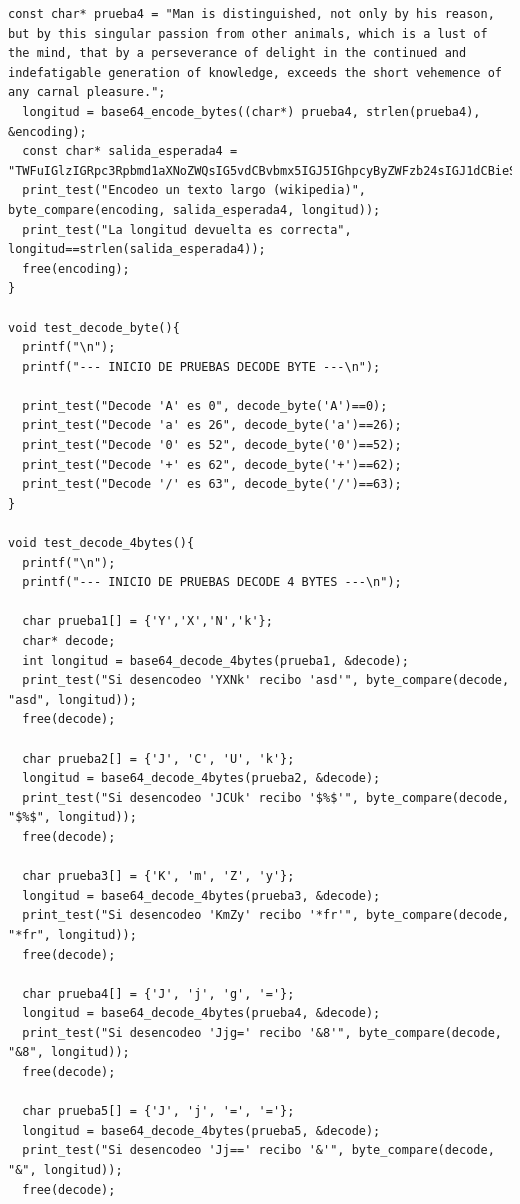 \documentclass[11pt]{article}
\begin{document}
\begin{lstlisting}[style=Cstyle]
  const char* prueba4 = "Man is distinguished, not only by his reason, but by this singular passion from other animals, which is a lust of the mind, that by a perseverance of delight in the continued and indefatigable generation of knowledge, exceeds the short vehemence of any carnal pleasure.";
  longitud = base64_encode_bytes((char*) prueba4, strlen(prueba4), &encoding);
  const char* salida_esperada4 = "TWFuIGlzIGRpc3Rpbmd1aXNoZWQsIG5vdCBvbmx5IGJ5IGhpcyByZWFzb24sIGJ1dCBieSB0aGlzIHNpbmd1bGFyIHBhc3Npb24gZnJvbSBvdGhlciBhbmltYWxzLCB3aGljaCBpcyBhIGx1c3Qgb2YgdGhlIG1pbmQsIHRoYXQgYnkgYSBwZXJzZXZlcmFuY2Ugb2YgZGVsaWdodCBpbiB0aGUgY29udGludWVkIGFuZCBpbmRlZmF0aWdhYmxlIGdlbmVyYXRpb24gb2Yga25vd2xlZGdlLCBleGNlZWRzIHRoZSBzaG9ydCB2ZWhlbWVuY2Ugb2YgYW55IGNhcm5hbCBwbGVhc3VyZS4=";
  print_test("Encodeo un texto largo (wikipedia)", byte_compare(encoding, salida_esperada4, longitud));
  print_test("La longitud devuelta es correcta", longitud==strlen(salida_esperada4));
  free(encoding);
}

void test_decode_byte(){
  printf("\n");
  printf("--- INICIO DE PRUEBAS DECODE BYTE ---\n");

  print_test("Decode 'A' es 0", decode_byte('A')==0);
  print_test("Decode 'a' es 26", decode_byte('a')==26);
  print_test("Decode '0' es 52", decode_byte('0')==52);
  print_test("Decode '+' es 62", decode_byte('+')==62);
  print_test("Decode '/' es 63", decode_byte('/')==63);
}

void test_decode_4bytes(){
  printf("\n");
  printf("--- INICIO DE PRUEBAS DECODE 4 BYTES ---\n");

  char prueba1[] = {'Y','X','N','k'};
  char* decode;
  int longitud = base64_decode_4bytes(prueba1, &decode);
  print_test("Si desencodeo 'YXNk' recibo 'asd'", byte_compare(decode, "asd", longitud));
  free(decode);

  char prueba2[] = {'J', 'C', 'U', 'k'};
  longitud = base64_decode_4bytes(prueba2, &decode);
  print_test("Si desencodeo 'JCUk' recibo '$%$'", byte_compare(decode, "$%$", longitud));
  free(decode);

  char prueba3[] = {'K', 'm', 'Z', 'y'};
  longitud = base64_decode_4bytes(prueba3, &decode);
  print_test("Si desencodeo 'KmZy' recibo '*fr'", byte_compare(decode, "*fr", longitud));
  free(decode);

  char prueba4[] = {'J', 'j', 'g', '='};
  longitud = base64_decode_4bytes(prueba4, &decode);
  print_test("Si desencodeo 'Jjg=' recibo '&8'", byte_compare(decode, "&8", longitud));
  free(decode);

  char prueba5[] = {'J', 'j', '=', '='};
  longitud = base64_decode_4bytes(prueba5, &decode);
  print_test("Si desencodeo 'Jj==' recibo '&'", byte_compare(decode, "&", longitud));
  free(decode);


\end{lstlisting}
\end{document}
